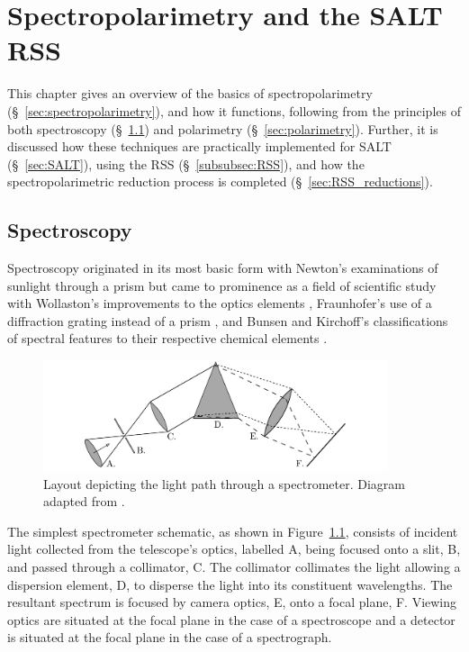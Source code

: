 \chapter{Spectropolarimetry and the SALT RSS}

This chapter gives an overview of the basics of spectropolarimetry (\S~\ref{sec:spectropolarimetry}), and how it functions, following from the principles of both spectroscopy (\S~\ref{sec:spectroscopy}) and polarimetry (\S~\ref{sec:polarimetry}). Further, it is discussed how these techniques are practically implemented for \gls{SALT} (\S~\ref{sec:SALT}), using the \gls{RSS} (\S~\ref{subsubsec:RSS}), and how the spectropolarimetric reduction process is completed (\S~\ref{sec:RSS_reductions}).

\section{Spectroscopy}\label{sec:spectroscopy}

Spectroscopy originated in its most basic form with Newton's examinations of sunlight through a prism \citep{opticks} but came to prominence as a field of scientific study with Wollaston's improvements to the optics elements \citep{WollPrism}, Fraunhofer's use of a diffraction grating instead of a prism \citep{FraunGrating}, and Bunsen and Kirchoff's classifications of spectral features to their respective chemical elements \citep{KirBunSpec}.

\begin{figure}[t]
    \centering
    \includegraphics[width = 0.9\textwidth]{figures/2_spectrometer.pdf}
    \caption{Layout depicting the light path through a spectrometer. Diagram adapted from \cite{BirneyObsAstro}.}
    \label{fig:spectrometer}
\end{figure}

The simplest spectrometer schematic, as shown in Figure~\ref{fig:spectrometer}, consists of incident light collected from the telescope's optics, labelled A, being focused onto a slit, B, and passed through a collimator, C. The collimator collimates the light allowing a dispersion element, D, to disperse the light into its constituent wavelengths. The resultant spectrum is focused by camera optics, E, onto a focal plane, F. Viewing optics are situated at the focal plane in the case of a spectroscope and a detector is situated at the focal plane in the case of a spectrograph.

